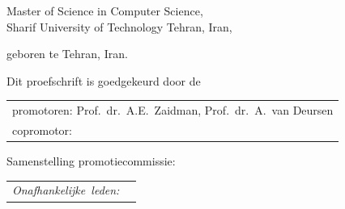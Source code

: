 \begin{titlepage}
\begin{center}
\bigskip
\bigskip

Master of Science in Computer Science, \\
Sharif University of Technology Tehran, Iran,

geboren te Tehran, Iran.

\vspace*{2\bigskipamount}

\end{center}

\clearpage
\thispagestyle{empty}

\noindent Dit proefschrift is goedgekeurd door de

\medskip\noindent
\begin{tabular}{l}
    promotoren: Prof.\ dr.\ A.E.\ Zaidman, Prof.\ dr.\ A.\ van Deursen \\
    copromotor: 
\end{tabular}

\bigskip
\noindent Samenstelling promotiecommissie:

\medskip\noindent
\begin{tabular}{p{4.5cm}l}

    \medskip
    \mbox{\emph{Onafhankelijke leden:}} & \\
    


\end{tabular}
\end{titlepage}
